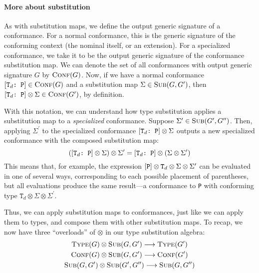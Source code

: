 \documentclass[../generics]{subfiles}
\begin{document}
\paragraph{More about substitution} As with substitution maps, we define the output generic signature of a conformance. For a normal conformance, this is the generic signature of the conforming context (the nominal itself, or an extension). For a specialized conformance, we take it to be the output generic signature of the conformance substitution map. We can denote the set of all conformances with output generic signature $G$ by $\textsc{Conf}({G})$. Now, if we have a normal conformance $[\texttt{$\texttt{T}_d$:~P}]\in\textsc{Conf}({G})$ and a substitution map $\Sigma\in\textsc{Sub}({G, G^\prime})$, then $[\texttt{$\texttt{T}_d$:~P}]\otimes\Sigma\in\textsc{Conf}({G^\prime})$, by definition.

With this notation, we can understand how type substitution applies a substitution map to a \emph{specialized} conformance. Suppose $\Sigma^\prime\in\textsc{Sub}({G^\prime, G^{\prime\prime}})$. Then, applying $\Sigma^\prime$ to the specialized conformance $[\texttt{$\texttt{T}_d$:~P}]\otimes\Sigma$ outputs a new specialized conformance with the composed substitution map:
\[([\texttt{$\texttt{T}_d$:~P}]\otimes\Sigma)\otimes\Sigma^\prime=[\texttt{$\texttt{T}_d$:~P}]\otimes(\Sigma\otimes\Sigma^\prime)\]
This means that, for example, the expression $[\texttt{P}]\otimes\texttt{T}_d\otimes\Sigma\otimes\Sigma^\prime$ can be evaluated in one of several ways, corresponding to each possible placement of parentheses, but all evaluations produce the same result---a conformance to \texttt{P} with conforming type $\texttt{T}_d\otimes\Sigma\otimes\Sigma^\prime$.

Thus, we can apply substitution maps to conformances, just like we can apply them to types, and compose them with other substitution maps. To recap, we now have three ``overloads'' of \index{$\otimes$}$\otimes$ in our type substitution algebra:
\begin{gather*}
\textsc{Type}({G})\otimes\textsc{Sub}({G, G^\prime})\longrightarrow\textsc{Type}({G^\prime})\\
\textsc{Conf}({G})\otimes\textsc{Sub}({G, G^\prime})\longrightarrow\textsc{Conf}({G^\prime})\\
\textsc{Sub}({G, G^\prime})\otimes\textsc{Sub}({G^\prime, G^{\prime\prime}})\longrightarrow\textsc{Sub}({G, G^{\prime\prime}})
\end{gather*}
\end{document}
